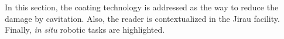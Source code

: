  


In this section, the coating technology is addressed as the way to
reduce the damage by cavitation. Also, the reader is contextualized in
the Jirau facility. Finally, \textit{in situ} robotic tasks are highlighted.

